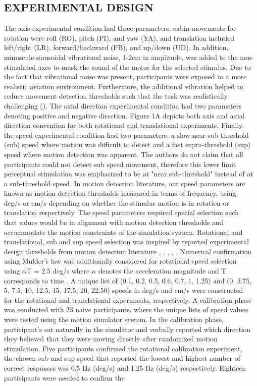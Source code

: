 \documentclass[11pt, onecolumn]{article}
\begin{document}
\subsection{EXPERIMENTAL DESIGN}
The axis experimental condition had three parameters, cabin movements for rotation were roll (RO), pitch (PI), and yaw (YA), and translation included left/right (LR), forward/backward (FB), and up/down (UD).  In addition, minuscule sinusoidal vibrational noise, 1-2cm in amplitude, was added to the non-stimulated axes to mask the sound of the motor for the selected stimulus.  Due to the fact that vibrational noise was present, participants were exposed to a more realistic aviation environment.  Furthermore, the additional vibration helped to reduce movement detection thresholds such that the task was realistically challenging (\cite{Chaudhuri_2013_Wholebody}).  The axial direction experimental condition had two parameters denoting positive and negative direction.  Figure 1A depicts both axis and axial direction convention for both rotational and translational experiments.  Finally, the speed experimental condition had two parameters, a slow near sub-threshold (sub) speed where motion was difficult to detect and a fast supra-threshold (sup) speed where motion detection was apparent.  The authors do not claim that all participants could not detect sub speed movement, therefore this lower limit perceptual stimulation was emphasized to be at "near sub-threshold" instead of at a sub-threshold speed.  In motion detection literature, our speed parameters are known as motion detection thresholds measured in terms of frequency, using deg/s or cm/s depending on whether the stimulus motion is in rotation or translation respectively.  The speed parameters required special selection such that values would be in alignment with motion detection thresholds and accommodate the motion constraints of the simulation system.  Rotational and translational, sub and sup speed selection was inspired by reported experimental design thresholds from motion detection literature \cite{Hartmann_2014_Direction}, \cite{BermudezRey_2016_Vestibular}, \cite{Karmali_2017_Multivariate}, \cite{Valko_2012_Vestibular}, \cite{Melvill_1978_Vertical}.  Numerical confirmation using Mulder's law was additionally considered for rotational speed selection using $\alpha$T = 2.5 deg/s where $\alpha$ denotes the acceleration magnitude and T corresponds to time \cite{Previc_2004_Spatial}.  A unique list of (0.1, 0.2, 0.5, 0.6, 0.7, 1, 1.25) and (0, 3.75, 5, 7.5, 10, 12.5, 15, 17.5, 20, 22.50) speeds in deg/s and cm/s were constructed for the rotational and translational experiments, respectively.  A calibration phase was conducted with 23 naive participants, where the unique lists of speed values were tested using the motion simulator system.  In the calibration phase, participant’s sat naturally in the simulator and verbally reported which direction they believed that they were moving directly after randomized motion stimulation.  Five participants confirmed the rotational calibration experiment, the chosen sub and sup speed that reported the lowest and highest number of correct responses was 0.5 Hz (deg/s) and 1.25 Hz (deg/s) respectively.  Eighteen participants were needed to confirm the 
\end{document}
